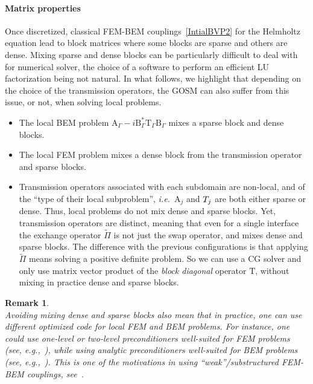 \documentclass[a4paper,11pt]{article}
\newcommand{\mA}{\mathrm{A}}
\newcommand{\mB}{\mathrm{B}}
\newcommand{\mT}{\mathrm{T}}
\newcommand{\SchurSchur}{\textit{S-S}}
\newcommand{\SchurYukawa}{\textit{Y-S}}
\newcommand{\YukawaYukawa}{\textit{Y-Y}}
\newtheorem{rem}[defn]{Remark}
\begin{document}
\paragraph{Matrix properties}
Once discretized, classical FEM-BEM couplings~\eqref{IntialBVP2} for the Helmholtz equation lead to block matrices where some blocks are sparse and others are dense. Mixing sparse and dense blocks can be particularly difficult to deal with for numerical solver, the choice of a software to perform an efficient LU factorization being not natural.
In what follows, we highlight that depending on the choice of the transmission operators, the GOSM can also suffer from this issue, or not, when solving local problems.
\begin{itemize}
  \item[\SchurSchur{}] The local BEM problem \(\mA_{\Gamma} -i \mB_{\Gamma}^* \mT_{\Gamma} \mB_{\Gamma}\) mixes a sparse block and dense blocks.
  \item[\YukawaYukawa{}] The local FEM problem mixes a dense block from the transmission operator and sparse blocks.
  \item[\SchurYukawa{}] Transmission operators associated with each subdomain are non-local, and of the ``type of their local subproblem'', \textit{i.e.}~\(\mA_{j}\) and \(\mathcal\mT_{j}\) are both either sparse or dense. Thus, local problems do not mix dense and sparse blocks. Yet, transmission operators are distinct, meaning that even for a single interface the exchange operator \(\tilde{\Pi}\) is not just the swap operator, and mixes dense and sparse blocks. The difference with the previous configurations is that applying \(\tilde{\Pi}\) means solving a positive definite problem. So we can use a CG solver and only use matrix vector product of the \emph{block diagonal} operator \(\mT\), without mixing in practice dense and sparse blocks.
\end{itemize}

\begin{rem}\quad\\
  Avoiding mixing dense and sparse blocks also mean that in practice, one can use different optimized code for local FEM and BEM problems. For instance, one could use one-level or two-level preconditioners well-suited for FEM problems (see, e.g.,~\cite{LahayeTangEtAl2017MSH}), while using analytic preconditioners well-suited for BEM problems (see, e.g.,~\cite{AntoineBoubendir2008IPS}).
  This is one of the motivations in using ``weak''/substructured FEM-BEM couplings, see~\cite{Caudron2018CFB,CaudronAntoineEtAl2020OWC}.
\end{rem}
\end{document}
